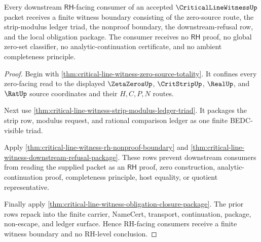 \begin{theorem}
\label{thm:critical-line-witness-rh-consumer-boundary-package}
Every downstream $\mathsf{RH}$-facing consumer of an accepted $\CriticalLineWitnessUp$ packet receives a finite witness boundary consisting of the zero-source route, the strip-modulus ledger triad, the nonproof boundary, the downstream-refusal row, and the local obligation package. The consumer receives no $\mathsf{RH}$ proof, no global zero-set classifier, no analytic-continuation certificate, and no ambient completeness principle.
\end{theorem}
\begin{proof}
Begin with \autoref{thm:critical-line-witness-zero-source-totality}. It confines every zero-facing read to the displayed $\ZetaZerosUp$, $\CritStripUp$, $\RealUp$, and $\RatUp$ source coordinates and their $H,C,P,N$ routes.

Next use \autoref{thm:critical-line-witness-strip-modulus-ledger-triad}. It packages the strip row, modulus request, and rational comparison ledger as one finite BEDC-visible triad.

Apply \autoref{thm:critical-line-witness-rh-nonproof-boundary} and \autoref{thm:critical-line-witness-downstream-refusal-package}. These rows prevent downstream consumers from reading the supplied packet as an $\mathsf{RH}$ proof, zero construction, analytic-continuation proof, completeness principle, host equality, or quotient representative.

Finally apply \autoref{thm:critical-line-witness-obligation-closure-package}. The prior rows repack into the finite carrier, NameCert, transport, continuation, package, non-escape, and ledger surface. Hence RH-facing consumers receive a finite witness boundary and no RH-level conclusion.
\end{proof}


